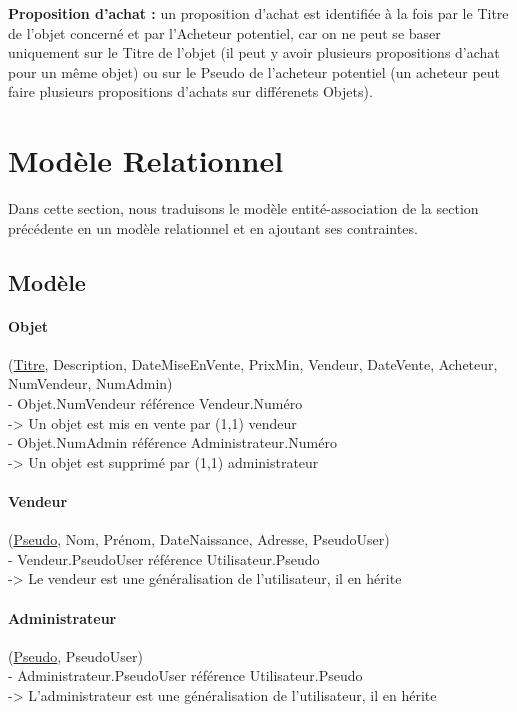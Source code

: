 \documentclass[a4paper,11pt]{article}
\begin{document}
\textbf{Proposition d'achat :} un proposition d'achat est identifiée à la fois par le Titre de l'objet concerné et par l'Acheteur potentiel,
car on ne peut se baser uniquement sur le Titre de l'objet (il peut y avoir plusieurs propositions d'achat pour un même objet)
ou sur le Pseudo de l'acheteur potentiel (un acheteur peut faire plusieurs propositions d'achats sur différenets Objets).

\section{Modèle Relationnel}
Dans cette section, nous traduisons le modèle entité-association de la section précédente en un modèle relationnel et en ajoutant ses contraintes.

\subsection{Modèle}

\indent

\paragraph{Objet} (\underline{Titre}, Description, DateMiseEnVente, PrixMin, Vendeur, DateVente, Acheteur, NumVendeur, NumAdmin)\\
\indent - Objet.NumVendeur référence Vendeur.Numéro \\
\indent \indent -> Un objet est mis en vente par (1,1) vendeur\\
\indent - Objet.NumAdmin référence Administrateur.Numéro \\
\indent \indent -> Un objet est supprimé par (1,1) administrateur


\paragraph{Vendeur} (\underline{Pseudo}, Nom, Prénom, DateNaissance, Adresse, PseudoUser)\\
\indent - Vendeur.PseudoUser référence Utilisateur.Pseudo \\
\indent \indent -> Le vendeur est une généralisation de l'utilisateur, il en hérite

\paragraph{Administrateur} (\underline{Pseudo}, PseudoUser)\\
\indent - Administrateur.PseudoUser référence Utilisateur.Pseudo \\
\indent \indent -> L'administrateur est une généralisation de l'utilisateur, il en hérite
\end{document}

